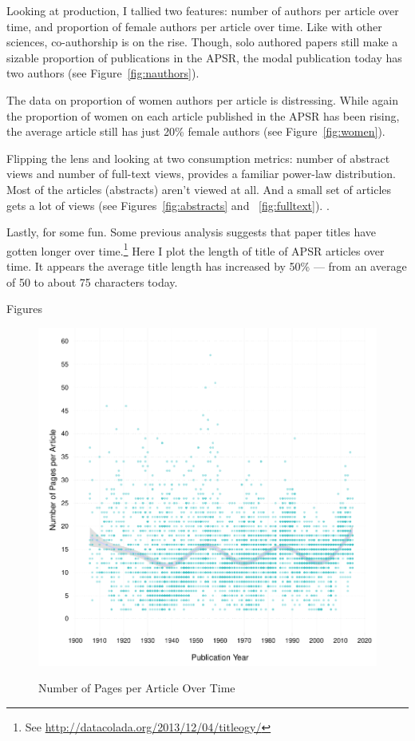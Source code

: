 \documentclass[11pt]{article}
\begin{document}
Looking at production, I tallied two features: number of authors per article over time, and proportion of female authors per article over time. Like with other sciences, co-authorship is on the rise. Though, solo authored papers still make a sizable proportion of publications in the APSR, the modal publication today has two authors (see Figure~\ref{fig:nauthors}).

The data on proportion of women authors per article is distressing. While again the proportion of women on each article published in the APSR has been rising, the average article still has just 20\% female authors (see Figure~\ref{fig:women}).  

Flipping the lens and looking at two consumption metrics: number of abstract views and number of full-text views, provides a familiar power-law distribution. Most of the articles (abstracts) aren't viewed at all. And a small set of articles gets a lot of views (see Figures~\ref{fig:abstracts} and ~\ref{fig:fulltext}). .

Lastly, for some fun. Some previous analysis suggests that paper titles have gotten longer over time.\footnote{See \href{http://datacolada.org/2013/12/04/titleogy/}{http://datacolada.org/2013/12/04/titleogy/}} Here I plot the length of title of APSR articles over time. It appears the average title length has increased by 50\% --- from an average of 50 to about 75 characters today.

\clearpage
\begin{center}
\large{Figures}
\end{center}

\begin{figure}[htbp]
\centering
\caption{Number of Pages per Article Over Time}
\includegraphics[scale=.85]{../figs/n_pages_per_article_over_time.pdf}
\label{fig:pages}
\end{figure}
\end{document}

